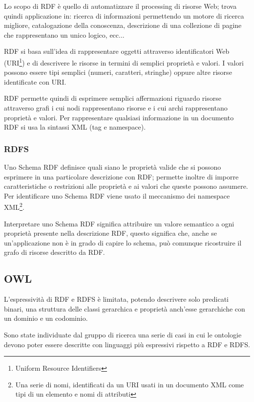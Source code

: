 Lo scopo di RDF è quello di automatizzare il processing di risorse Web; trova quindi applicazione in: ricerca di informazioni permettendo un motore di ricerca migliore, catalogazione della conoscenza, descrizione di una collezione di pagine che rappresentano un unico  logico, ecc...\cite{brickley1998resource}

RDF si basa sull'idea di rappresentare oggetti attraverso identificatori Web (URI\footnote{Uniform Resource Identifiers}) e di descrivere le risorse in termini di semplici proprietà e valori. I valori possono essere tipi semplici (numeri, caratteri, stringhe) oppure altre risorse identificate con URI.

RDF permette quindi di esprimere semplici affermazioni riguardo risorse attraverso grafi i cui nodi rappresentano risorse e i cui archi rappresentano proprietà e valori. Per rappresentare qualsiasi informazione in un documento RDF si usa la sintassi XML (tag e namespace)\cite{manola2004rdf}.
\subsubsection{RDFS}
Uno Schema RDF definisce quali siano le proprietà valide che si possono esprimere in una particolare descrizione con RDF; permette inoltre di imporre caratteristiche o restrizioni alle proprietà e ai valori che queste possono assumere. Per identificare uno Schema RDF viene usato il meccanismo dei namespace XML\footnote{Una serie di nomi, identificati da un URI usati in un documento XML come tipi di un elemento e nomi di attributi\cite{bray1999namespaces}}.

Interpretare uno Schema RDF significa attribuire un valore semantico a ogni proprietà presente nella descrizione RDF, questo significa che, anche se un'applicazione non è in grado di capire lo schema, può comunque ricostruire il grafo di risorse descritto da RDF\cite{miller1998introduction}.
\subsection{OWL}
L'espressività di RDF e RDFS è limitata, potendo descrivere solo predicati binari, una struttura delle classi gerarchica e proprietà anch'esse gerarchiche con un dominio e un codominio.

Sono state individuate dal gruppo di ricerca  una serie di casi in cui le ontologie devono poter essere descritte con linguaggi più espressivi rispetto a RDF e RDFS\cite{antoniou2009web}.

